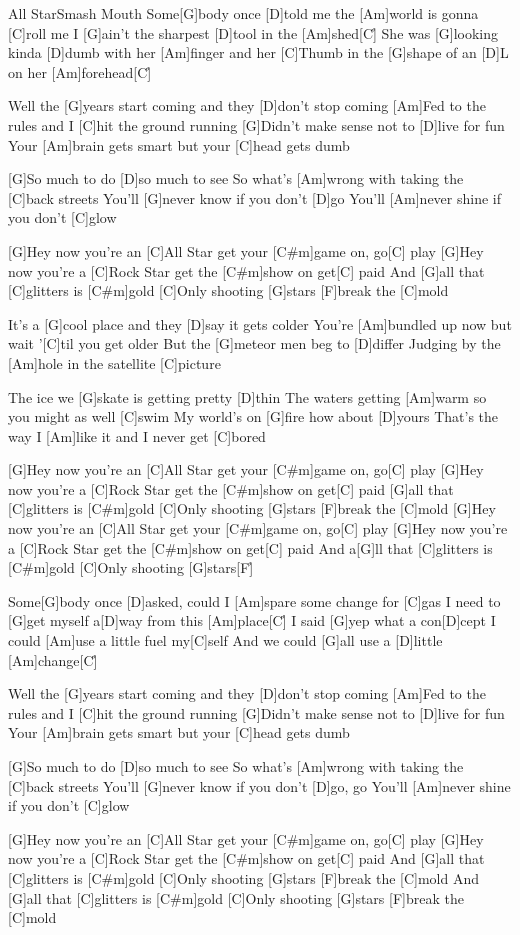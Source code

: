 \documentclass[../main.tex]{subfiles}
\begin{document}
\begin{song}{All Star}{Smash Mouth}{}        
Some[G]body once [D]told me the [Am]world is gonna [C]roll me
I [G]ain't the sharpest [D]tool in the [Am]shed[C]{\h}
She was [G]looking kinda [D]dumb with her [Am]finger and her
[C]Thumb in the [G]shape of an [D]{L} on her [Am]forehead[C]{\h}

Well the [G]years start coming and they [D]don't stop coming
[Am]Fed to the rules and I [C]hit the ground running
[G]Didn't make sense not to [D]live for fun
Your [Am]brain gets smart but your [C]head gets dumb

[G]So much to do [D]so much to see
So what's [Am]wrong with taking the [C]back streets
You'll [G]never know if you don't [D]go
You'll [Am]never shine if you don't [C]glow

[G]Hey now you're an [C]All Star get your [C#m]game on, go[C] play
[G]Hey now you're a [C]Rock Star get the [C#m]show on get[C] paid
And [G]all that [C]glitters is [C#m]gold
[C]Only shooting [G]stars [F]break the [C]mold

It's a [G]cool place and they [D]say it gets colder
You're [Am]bundled up now but wait '[C]til you get older
But the [G]meteor men beg to [D]differ
Judging by the [Am]hole in the satellite [C]picture

The ice we [G]skate is getting pretty [D]thin
The waters getting [Am]warm so you might as well [C]swim
My world's on [G]fire how about [D]yours
That's the way I [Am]like it and I never get [C]bored

[G]Hey now you're an [C]All Star get your [C#m]game on, go[C] play
[G]Hey now you're a [C]Rock Star get the [C#m]show on get[C] paid
[G]all that [C]glitters is [C#m]gold
[C]Only shooting [G]stars [F]break the [C]mold
[G]Hey now you're an [C]All Star get your [C#m]game on, go[C] play
[G]Hey now you're a [C]Rock Star get the [C#m]show on get[C] paid
And a[G]ll that [C]glitters is [C#m]gold
[C]Only shooting [G]stars[F]{\h}

\pagebreak
Some[G]body once [D]asked, could I [Am]spare some change for [C]gas
I need to [G]get myself a[D]way from this [Am]place[C]{\h}
I said [G]yep what a con[D]cept I could [Am]use a little fuel my[C]self
And we could [G]all use a [D]little [Am]change[C]{\h}

Well the [G]years start coming and they [D]don't stop coming
[Am]Fed to the rules and I [C]hit the ground running
[G]Didn't make sense not to [D]live for fun
Your [Am]brain gets smart but your [C]head gets dumb

[G]So much to do [D]so much to see
So what's [Am]wrong with taking the [C]back streets
You'll [G]never know if you don't [D]go, go
You'll [Am]never shine if you don't [C]glow

[G]Hey now you're an [C]All Star get your [C#m]game on, go[C] play
[G]Hey now you're a [C]Rock Star get the [C#m]show on get[C] paid
And [G]all that [C]glitters is [C#m]gold
[C]Only shooting [G]stars [F]break the [C]mold
And [G]all that [C]glitters is [C#m]gold
[C]Only shooting [G]stars [F]break the [C]mold
\end{song}
\end{document}
